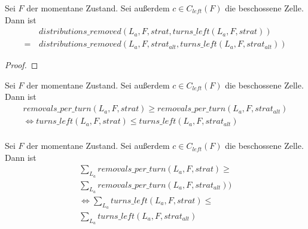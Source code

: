 \documentclass[a4paper,12pt]{llncs}
\numberwithin{equation}{section}
\begin{document}
\begin{lemma}
Sei $F$ der momentane Zustand.
Sei außerdem $c \in C_{left}(F)$ die beschossene Zelle.
Dann ist
\begin{align}
&distributions\_removed(L_a, F, strat, turns\_left(L_a, F, strat)) \\
=\,&distributions\_removed(L_a, F, strat_{alt}, turns\_left(L_a, F, strat_{alt}))
\end{align}
\end{lemma}

\begin{proof}
\end{proof}

\begin{lemma}
Sei $F$ der momentane Zustand.
Sei außerdem $c \in C_{left}(F)$ die beschossene Zelle.
Dann ist
\begin{align}
removals\_per\_turn(L_a, F, strat) \geq removals\_per\_turn(L_a, F, strat_{alt}) \\ \nonumber
\Leftrightarrow turns\_left(L_a, F, strat) \leq turns\_left(L_a, F, strat_{alt}) \\ \nonumber
\end{align}
\end{lemma}

\begin{lemma}
Sei $F$ der momentane Zustand.
Sei außerdem $c \in C_{left}(F)$ die beschossene Zelle.
Dann ist
\begin{align}
\sum_{L_a}{removals\_per\_turn(L_a, F, strat)} \geq \\
\sum_{L_a}{removals\_per\_turn(L_a, F, strat_{alt}))} \\
\Leftrightarrow
\sum_{L_a}{turns\_left(L_a, F, strat)} \leq \\
\sum_{L_a}{turns\_left(L_a, F, strat_{alt})} \\
\end{align}
\end{lemma}
\end{document}
